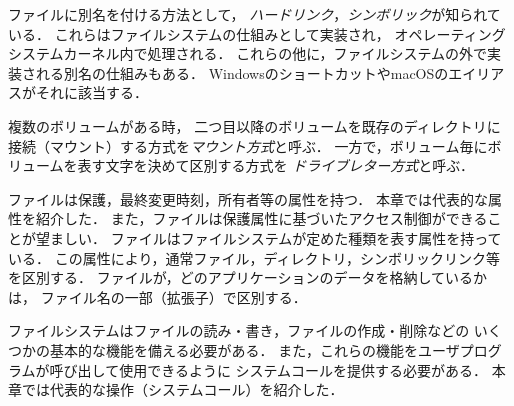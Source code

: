 ファイルに別名を付ける方法として，
\emph{ハードリンク}，\emph{シンボリック}が知られている．
これらはファイルシステムの仕組みとして実装され，
オペレーティングシステムカーネル内で処理される．
これらの他に，ファイルシステムの外で実装される別名の仕組みもある．
WindowsのショートカットやmacOSのエイリアスがそれに該当する．

複数のボリュームがある時，
二つ目以降のボリュームを既存のディレクトリに
接続（マウント）する方式を\emph{マウント方式}と呼ぶ．
一方で，ボリューム毎にボリュームを表す文字を決めて区別する方式を
\emph{ドライブレター方式}と呼ぶ．

ファイルは保護，最終変更時刻，所有者等の属性を持つ．
本章では代表的な属性を紹介した．
また，ファイルは保護属性に基づいたアクセス制御ができることが望ましい．
ファイルはファイルシステムが定めた種類を表す属性を持っている．
この属性により，通常ファイル，ディレクトリ，シンボリックリンク等を区別する．
ファイルが，どのアプリケーションのデータを格納しているかは，
ファイル名の一部（拡張子）で区別する．

ファイルシステムはファイルの読み・書き，ファイルの作成・削除などの
いくつかの基本的な機能を備える必要がある．
また，これらの機能をユーザプログラムが呼び出して使用できるように
システムコールを提供する必要がある．
本章では代表的な操作（システムコール）を紹介した．

